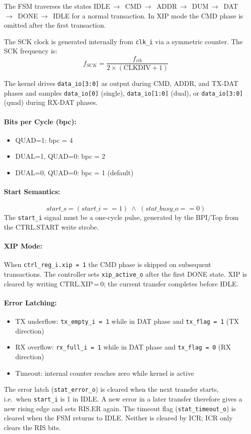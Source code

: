 The FSM traverses the states IDLE\,$\to$\, CMD\,$\to$\, ADDR\,$\to$\, DUM\,$\to$\, DAT\,%
$\to$\, DONE\,$\to$\, IDLE for a normal transaction. In XIP mode the CMD phase
is omitted after the first transaction.

The SCK clock is generated internally from \texttt{clk\_i} via a symmetric
counter. The SCK frequency is:
\[
  f_{SCK} = \frac{f_{clk}}{2 \times (\text{CLKDIV} + 1)}
\]

The kernel drives \texttt{data\_io[3:0]} as output during CMD, ADDR, and TX-DAT
phases and samples \texttt{data\_io[0]} (single), \texttt{data\_io[1:0]} (dual),
or \texttt{data\_io[3:0]} (quad) during RX-DAT phases.

\paragraph{Bits per Cycle (bpc):}
\begin{itemize}
  \item QUAD=1: bpc = 4
  \item DUAL=1, QUAD=0: bpc = 2
  \item DUAL=0, QUAD=0: bpc = 1 (default)
\end{itemize}

\paragraph{Start Semantics:}
\[
  start\_s = (start\_i == 1) \;\land\; (stat\_busy\_o == 0)
\]
The \texttt{start\_i} signal must be a one-cycle pulse, generated by the BPI/Top
from the CTRL.START write strobe.

\paragraph{XIP Mode:}
When \texttt{ctrl\_reg\_i.xip = 1} the CMD phase is skipped on subsequent
transactions. The controller sets \texttt{xip\_active\_o} after the first
DONE state. XIP is cleared by writing CTRL.XIP\,=\,0; the current transfer
completes before IDLE.

\paragraph{Error Latching:}
\begin{itemize}
  \item TX underflow: \texttt{tx\_empty\_i = 1} while in DAT phase and
    \texttt{tx\_flag = 1} (TX direction)
  \item RX overflow: \texttt{rx\_full\_i = 1} while in DAT phase and
    \texttt{tx\_flag = 0} (RX direction)
  \item Timeout: internal counter reaches zero while kernel is active
\end{itemize}
The error latch (\texttt{stat\_error\_o}) is cleared when the next transfer
starts, i.e.\ when \texttt{start\_i} is 1 in IDLE. A new error in a later transfer
therefore gives a new rising edge and sets RIS.ER again. The timeout flag
(\texttt{stat\_timeout\_o}) is cleared when the FSM returns to IDLE.
Neither is cleared by ICR; ICR only clears the RIS bits.

